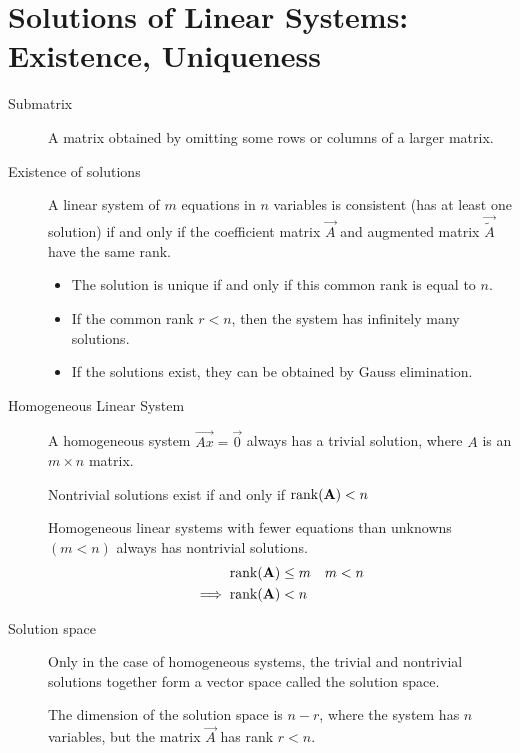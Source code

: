 \section{Solutions of Linear Systems: Existence, Uniqueness}
\begin{description}
    \item[Submatrix] A matrix obtained by omitting some rows or columns of a larger
        matrix.

    \item[Existence of solutions] A linear system of $ m $ equations in $ n $ variables
        is consistent (has at least one solution) if and only if the coefficient matrix
        $ \vec{A} $ and augmented matrix $ \vec{\tilde{A}} $ have the same rank. \par

        \begin{itemize}
            \item The solution is unique if and only if this common rank is equal to
                  $ n $.
            \item If the common rank $ r < n $, then the system has infinitely many
                  solutions.
            \item If the solutions exist, they can be obtained by Gauss elimination.
        \end{itemize}

    \item[Homogeneous Linear System] A homogeneous system $ \vec{Ax} = \vec{0} $ always
        has a trivial solution, where $ A $ is an $ m \times n $ matrix. \par
        Nontrivial solutions exist if and only if $ \operatorname{rank}(\mathbf{A})  < n $ \par

        Homogeneous linear systems with fewer equations than unknowns $ (m < n) $
        always has nontrivial solutions.
        \begin{align}
            \operatorname{rank}(\mathbf{A})          & \leq m & m & < n \\
            \implies \operatorname{rank}(\mathbf{A}) & < n
        \end{align}

    \item[Solution space] Only in the case of homogeneous systems, the trivial and
        nontrivial solutions together form a vector space called the solution space. \par

        The dimension of the solution space is $ n-r $, where the system has $ n $
        variables, but the matrix $ \vec{A} $ has rank $ r < n $. \par


\end{description}
